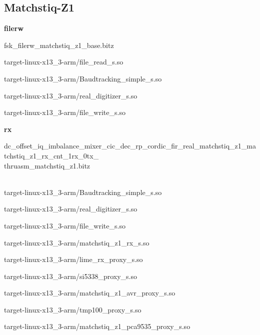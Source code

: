 \pagebreak
\subsection{Matchstiq-Z1}
	\noindent\textbf{filerw}
	\begin{itemize}
	\begin{minipage}[t]{.5\textwidth}
	\item fsk\_filerw\_matchstiq\_z1\_base.bitz
	\item target-linux-x13\_3-arm/file\_read\_s.so
	\item target-linux-x13\_3-arm/Baudtracking\_simple\_s.so
	\end{minipage}
	\begin{minipage}[t]{.5\textwidth}
	\item target-linux-x13\_3-arm/real\_digitizer\_s.so
	\item target-linux-x13\_3-arm/file\_write\_s.so
	\end{minipage}
	\end{itemize}

	\noindent\textbf{rx}
	\begin{itemize}
	\item dc\_offset\_iq\_imbalance\_mixer\_cic\_dec\_rp\_cordic\_fir\_real\_matchstiq\_z1\_matchstiq\_z1\_rx\_cnt\_1rx\_0tx\_ \\ thruasm\_matchstiq\_z1.bitz \\ \\
	\begin{minipage}[t]{.5\textwidth}\item target-linux-x13\_3-arm/Baudtracking\_simple\_s.so
	\item target-linux-x13\_3-arm/real\_digitizer\_s.so
	\item target-linux-x13\_3-arm/file\_write\_s.so
	\item target-linux-x13\_3-arm/matchstiq\_z1\_rx\_s.so
	\item target-linux-x13\_3-arm/lime\_rx\_proxy\_s.so
	\end{minipage}
	\begin{minipage}[t]{.5\textwidth}	\item target-linux-x13\_3-arm/si5338\_proxy\_s.so
	\item target-linux-x13\_3-arm/matchstiq\_z1\_avr\_proxy\_s.so
	\item target-linux-x13\_3-arm/tmp100\_proxy\_s.so
	\item target-linux-x13\_3-arm/matchstiq\_z1\_pca9535\_proxy\_s.so
	\end{minipage}
	\end{itemize}

